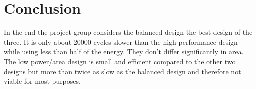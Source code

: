 \section{Conclusion}
In the end the project group considers the balanced design the best design of the three. 
It is only about 20000 cycles slower than the high performance design while using less than half of the energy. 
They don't differ significantly in area. 
The low power/area design is small and efficient compared to the other two designs but more than twice as slow as the balanced design and therefore not viable for most purposes.